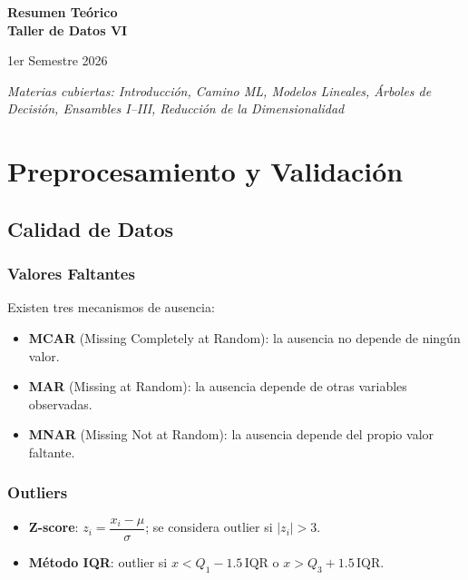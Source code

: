 \documentclass[12pt, a4paper]{article}
\begin{document}
\begin{titlepage}
  \centering
  \vspace*{2cm}
  {\Huge\bfseries\color{azul} Resumen Teórico\\[0.4em]
   Taller de Datos VI\par}
  \vspace{0.5cm}
  {\large 1er Semestre 2026\par}
  \vspace{3cm}
  {\large\itshape Materias cubiertas: Introducción, Camino ML, Modelos Lineales,
   Árboles de Decisión, Ensambles I–III, Reducción de la Dimensionalidad\par}
\end{titlepage}

\tableofcontents
\newpage

\section{Preprocesamiento y Validación}

\subsection{Calidad de Datos}

\subsubsection{Valores Faltantes}
Existen tres mecanismos de ausencia:
\begin{itemize}
  \item \textbf{MCAR} (Missing Completely at Random): la ausencia no depende de ningún valor.
  \item \textbf{MAR} (Missing at Random): la ausencia depende de otras variables observadas.
  \item \textbf{MNAR} (Missing Not at Random): la ausencia depende del propio valor faltante.
\end{itemize}

\subsubsection{Outliers}
\begin{itemize}
  \item \textbf{Z-score}: $z_i = \dfrac{x_i - \mu}{\sigma}$; se considera outlier si $|z_i| > 3$.
  \item \textbf{Método IQR}: outlier si $x < Q_1 - 1.5\,\text{IQR}$ o $x > Q_3 + 1.5\,\text{IQR}$.
\end{itemize}
\end{document}
